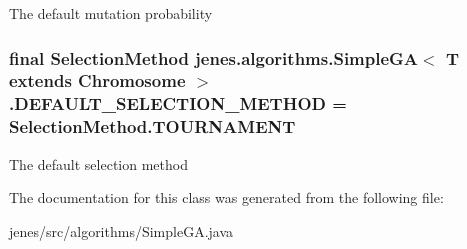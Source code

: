 The default mutation probability \hypertarget{classjenes_1_1algorithms_1_1_simple_g_a_3_01_t_01extends_01_chromosome_01_4_a93d44174d00fdf0a8ebedfa3badcde66}{
\subsubsection[{D\-E\-F\-A\-U\-L\-T\-\_\-\-S\-E\-L\-E\-C\-T\-I\-O\-N\-\_\-\-M\-E\-T\-H\-O\-D}]{\setlength{\rightskip}{0pt plus 5cm}final Selection\-Method jenes.\-algorithms.\-Simple\-G\-A$<$ T extends Chromosome $>$.D\-E\-F\-A\-U\-L\-T\-\_\-\-S\-E\-L\-E\-C\-T\-I\-O\-N\-\_\-\-M\-E\-T\-H\-O\-D = Selection\-Method.\-T\-O\-U\-R\-N\-A\-M\-E\-N\-T\hspace{0.3cm}{\ttfamily [static]}}}\label{classjenes_1_1algorithms_1_1_simple_g_a_3_01_t_01extends_01_chromosome_01_4_a93d44174d00fdf0a8ebedfa3badcde66}
The default selection method 

The documentation for this class was generated from the following file\-:\begin{DoxyCompactItemize}
\item 
jenes/src/algorithms/Simple\-G\-A.\-java\end{DoxyCompactItemize}
